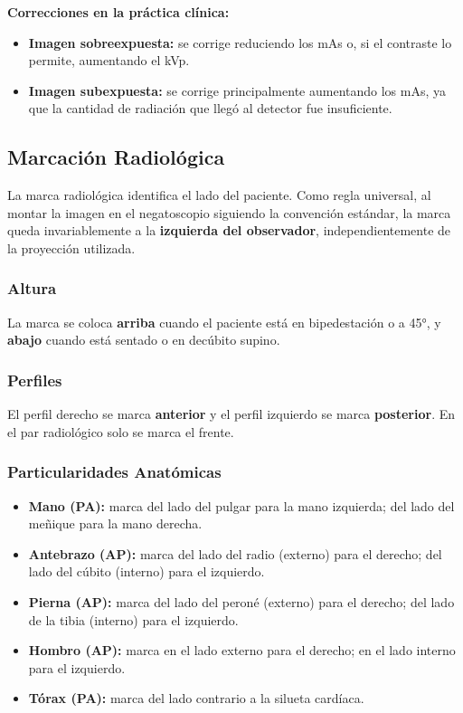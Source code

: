 	\textbf{Correcciones en la práctica clínica:}
	\begin{itemize}
		\item \textbf{Imagen sobreexpuesta:} se corrige reduciendo los mAs o, si el contraste lo permite, aumentando el kVp.
		\item \textbf{Imagen subexpuesta:} se corrige principalmente aumentando los mAs, ya que la cantidad de radiación que llegó al detector fue insuficiente.
	\end{itemize}
	
	\subsection{Marcación Radiológica}
	
	La marca radiológica identifica el lado del paciente. Como regla universal, al montar la imagen en el negatoscopio siguiendo la convención estándar, la marca queda invariablemente a la \textbf{izquierda del observador}, independientemente de la proyección utilizada.
	
	\subsubsection*{Altura}
	
	La marca se coloca \textbf{arriba} cuando el paciente está en bipedestación o a 45°, y \textbf{abajo} cuando está sentado o en decúbito supino.
	
	\subsubsection*{Perfiles}
	
	El perfil derecho se marca \textbf{anterior} y el perfil izquierdo se marca \textbf{posterior}. En el par radiológico solo se marca el frente.
	
	\subsubsection*{Particularidades Anatómicas}
	
	\begin{itemize}
		\item \textbf{Mano (PA):} marca del lado del pulgar para la mano izquierda; del lado del meñique para la mano derecha.
		\item \textbf{Antebrazo (AP):} marca del lado del radio (externo) para el derecho; del lado del cúbito (interno) para el izquierdo.
		\item \textbf{Pierna (AP):} marca del lado del peroné (externo) para el derecho; del lado de la tibia (interno) para el izquierdo.
		\item \textbf{Hombro (AP):} marca en el lado externo para el derecho; en el lado interno para el izquierdo.
		\item \textbf{Tórax (PA):} marca del lado contrario a la silueta cardíaca.
	\end{itemize}
	
